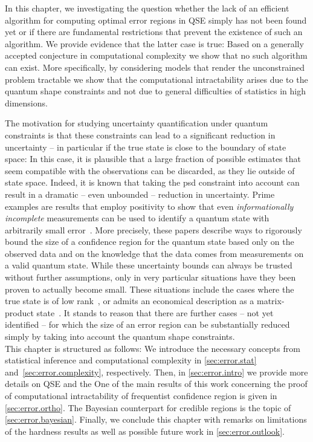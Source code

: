 In this chapter, we investigating the question whether the lack of an efficient algorithm for computing optimal error regions in QSE simply has not been found yet or if there are fundamental restrictions that prevent the existence of such an algorithm.
We provide evidence that the latter case is true:
Based on a generally accepted conjecture in computational complexity we show that no such algorithm can exist.
More specifically, by considering models that render the unconstrained problem tractable we show that the computational intractability arises due to the quantum shape constraints and not due to general difficulties of statistics in high dimensions.

The motivation for studying uncertainty quantification under quantum constraints is that these constraints can lead to a significant reduction in uncertainty -- in particular if the true state is close to the boundary of state space:
In this case, it is plausible that a large fraction of possible estimates that seem compatible with the observations can be discarded, as they lie outside of state space.
Indeed, it is known that taking the psd constraint into account can result in a dramatic -- even unbounded -- reduction in uncertainty.
Prime examples are results that employ positivity to show that even \emph{informationally incomplete} measurements can be used to identify a quantum state with arbitrarily small error~\cite{Cramer_2010_Efficient,Gross_2010_Quantum,Gross_2011_Recovering,Flammia_2012_Quantum,Nickl_2013_Confidence,Kalev_2015_Quantum}.
More precisely, these papers describe ways to rigorously bound the size of a confidence region for the quantum state based only on the observed data and on the knowledge that the data comes from measurements on a valid quantum state.
While these uncertainty bounds can always be trusted without further assumptions, only in very particular situations have they been proven to actually become small.
These situations include the cases where the true state is of low rank~\cite{Flammia_2012_Quantum,Nickl_2013_Confidence}, or admits an economical description as a matrix-product state~\cite{Cramer_2010_Efficient}.
It stands to reason that there are further cases -- not yet identified -- for which the size of an error region can be substantially reduced simply by taking into account the quantum shape constraints.\\


This chapter is structured as follows:
We introduce the necessary concepts from statistical inference and computational complexity in \cref{sec:error.stat} and~\ref{sec:error.complexity}, respectively.
Then, in \cref{sec:error.intro} we provide more details on QSE and the
One of the main results of this work concerning the proof of computational intractability of frequentist confidence region is given in \cref{sec:error.ortho}.
The Bayesian counterpart for credible regions is the topic of \cref{sec:error.bayesian}.
Finally, we conclude this chapter with remarks on limitations of the hardness results as well as possible future work in \cref{sec:error.outlook}.

